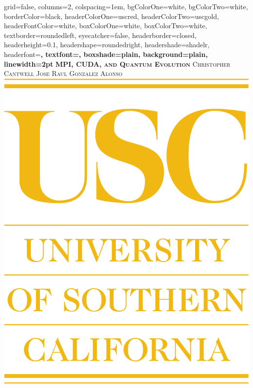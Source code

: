 \documentclass[portrait,paperwidth=24in,paperheight=36in,fontscale=0.5]{baposter}
\begin{document}

\begin{poster}%
  {
  grid=false,
  columns=2,
  colspacing=1em,
  bgColorOne=white,
  bgColorTwo=white,
  borderColor=black,
  headerColorOne=uscred,
  headerColorTwo=uscgold,
  headerFontColor=white,
  boxColorOne=white,
  boxColorTwo=white,
  textborder=roundedleft,
  eyecatcher=false,
  headerborder=closed,
  headerheight=0.1\textheight,
  headershape=roundedright,
  headershade=shadelr,
  headerfont=\Large\bf\textsc, %
  textfont={\setlength{\parindent}{1.5em}},
  boxshade=plain,
  background=plain,
  linewidth=2pt
  }%
  {}
  {\bf\textsc{MPI, CUDA, and Quantum Evolution}\vspace{0.5em}}
  {\textsc{Christopher Cantwell \hspace{14.0em} Jose Raul Gonzalez Alonso}\\ }
  {%
    \includegraphics[scale=0.2]{images/USC.pdf}
}
\end{poster}
\end{document}

